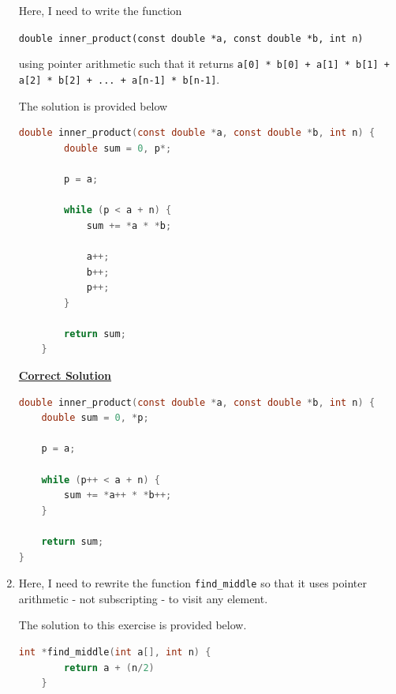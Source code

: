 \documentclass[12pt]{article}
\begin{document}
\begin{enumerate}[1.]
    Here, I need to write the function

    \bigskip

    \texttt{double inner\_product(const double *a, const double *b, int n)}

    \bigskip

    using pointer arithmetic such that it returns \texttt{a[0] * b[0] + a[1] *
    b[1] + a[2] * b[2] + ... + a[n-1] * b[n-1]}.

    \bigskip

    The solution is provided below

    \bigskip

\begin{lstlisting}[language=c]
    double inner_product(const double *a, const double *b, int n) {
        double sum = 0, p*;

        p = a;

        while (p < a + n) {
            sum += *a * *b;

            a++;
            b++;
            p++;
        }

        return sum;
    }
\end{lstlisting}

    \bigskip

    \begin{mdframed}
        \underline{\textbf{Correct Solution}}

        \bigskip

\begin{lstlisting}[language=c]
double inner_product(const double *a, const double *b, int n) {
    double sum = 0, *p;

    p = a;

    while (p++ < a + n) {
        sum += *a++ * *b++;
    }

    return sum;
}
\end{lstlisting}

    \end{mdframed}

    \item

    Here, I need to rewrite the function \texttt{find\_middle} so that it uses
    pointer arithmetic - not subscripting - to visit any element.

    \bigskip

    The solution to this exercise is provided below.

    \bigskip

\begin{lstlisting}[language=c]
    int *find_middle(int a[], int n) {
        return a + (n/2)
    }
\end{lstlisting}


\end{enumerate}
\end{document}
